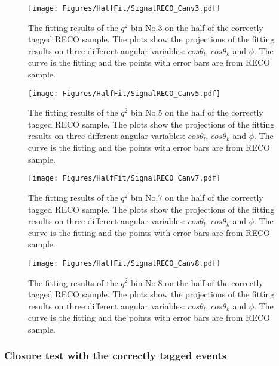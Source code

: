 \begin{figure}[!hbt]
  \centering
  \texttt{[image: Figures/HalfFit/SignalRECO\_Canv3.pdf]}
  \caption{The fitting results of the $q^2$ bin No.3 on the half of the correctly
    tagged RECO  sample. The plots show the projections of the fitting results on
    three different angular variables: $cos\theta_l$, $cos\theta_k$
    and $\phi$. The curve is the fitting and the points with error
    bars are from RECO sample. }
  \label{fig:halfrtag-bin3}
\end{figure}

\begin{figure}[!hbt]
  \centering
  \texttt{[image: Figures/HalfFit/SignalRECO\_Canv5.pdf]}
  \caption{The fitting results of the $q^2$ bin No.5 on the half of the correctly
    tagged RECO  sample. The plots show the projections of the fitting results on
    three different angular variables: $cos\theta_l$, $cos\theta_k$
    and $\phi$. The curve is the fitting and the points with error
    bars are from RECO sample. }
  \label{fig:halfrtag-bin5}
\end{figure}

\begin{figure}[!hbt]
  \centering
  \texttt{[image: Figures/HalfFit/SignalRECO\_Canv7.pdf]}
  \caption{The fitting results of the $q^2$ bin No.7 on the half of the correctly
    tagged RECO  sample. The plots show the projections of the fitting results on
    three different angular variables: $cos\theta_l$, $cos\theta_k$
    and $\phi$. The curve is the fitting and the points with error
    bars are from RECO sample. }
  \label{fig:halfrtag-bin7}
\end{figure}

\begin{figure}[!hbt]
  \centering
  \texttt{[image: Figures/HalfFit/SignalRECO\_Canv8.pdf]}
  \caption{The fitting results of the $q^2$ bin No.8 on the half of the correctly
    tagged RECO  sample. The plots show the projections of the fitting results on
    three different angular variables: $cos\theta_l$, $cos\theta_k$
    and $\phi$. The curve is the fitting and the points with error
    bars are from RECO sample. }
  \label{fig:halfrtag-bin8}
\end{figure}

\clearpage

\subsubsection{Closure test with the correctly tagged events}
\label{sec:fitval-closure-half}


